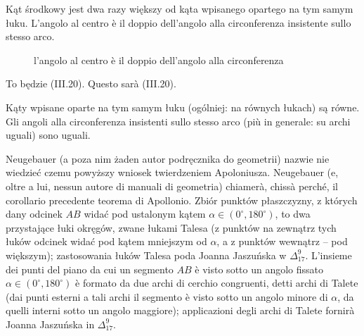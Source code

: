 \begin{proposition}
    Kąt środkowy jest dwa razy większy od kąta wpisanego opartego na tym samym łuku. %
    L'angolo al centro è il doppio dell'angolo alla circonferenza insistente sullo stesso arco. %
\begin{figure}[H]\centering%

    \caption{kąt środkowy jest dwa razy większy od wpisanego} %
    \caption{l'angolo al centro è il doppio dell'angolo alla circonferenza} %
\end{figure}
\end{proposition}

To będzie (III.20). %
Questo sarà (III.20). %

\begin{corollary}
    \label{maybe_3_28}
    Kąty wpisane oparte na tym samym łuku (ogólniej: na równych łukach) są równe. %
    Gli angoli alla circonferenza insistenti sullo stesso arco (più in generale: su archi uguali) sono uguali. %
\end{corollary}

Neugebauer (a poza nim żaden autor podręcznika do geometrii) nazwie nie wiedzieć czemu powyższy wniosek twierdzeniem Apoloniusza. %
Neugebauer (e, oltre a lui, nessun autore di manuali di geometria) chiamerà, chissà perché, il corollario precedente teorema di Apollonio. %
Zbiór punktów płaszczyzny, z których dany odcinek $AB$ widać pod ustalonym kątem $\alpha \in (0^\circ, 180^\circ)$, to dwa przystające łuki okręgów, zwane łukami Talesa (z punktów na zewnątrz tych łuków odcinek widać pod kątem mniejszym od $\alpha$, a z punktów wewnątrz -- pod większym); zastosowania łuków Talesa poda Joanna Jaszuńska w $\Delta_{17}^{9}$. %
L'insieme dei punti del piano da cui un segmento $AB$ è visto sotto un angolo fissato $\alpha \in (0^\circ, 180^\circ)$ è formato da due archi di cerchio congruenti, detti archi di Talete (dai punti esterni a tali archi il segmento è visto sotto un angolo minore di $\alpha$, da quelli interni sotto un angolo maggiore); applicazioni degli archi di Talete fornirà Joanna Jaszuńska in $\Delta_{17}^{9}$. %


